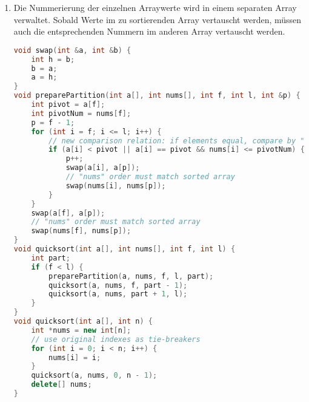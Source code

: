 \documentclass[11pt,a4paper]{article}
\begin{document}
\begin{loesung}
\begin{enumerate}
\begin{enumerate}[label=\roman*)]
            \item 
            Die Nummerierung der einzelnen Arraywerte wird in einem separaten Array verwaltet.
            Sobald Werte im zu sortierenden Array vertauscht werden, müssen auch die entsprechenden Nummern im anderen Array vertauscht werden.
            \begin{lstlisting}[language=c++]
void swap(int &a, int &b) {
    int h = b;
    b = a;
    a = h;
}
void preparePartition(int a[], int nums[], int f, int l, int &p) {
    int pivot = a[f];
    int pivotNum = nums[f];
    p = f - 1;
    for (int i = f; i <= l; i++) {
        // new comparison relation: if elements equal, compare by "num"
        if (a[i] < pivot || a[i] == pivot && nums[i] <= pivotNum) {
            p++;
            swap(a[i], a[p]);
            // "nums" order must match sorted array
            swap(nums[i], nums[p]);
        }
    }
    swap(a[f], a[p]);
    // "nums" order must match sorted array
    swap(nums[f], nums[p]);
}
void quicksort(int a[], int nums[], int f, int l) {
    int part;
    if (f < l) {
        preparePartition(a, nums, f, l, part);
        quicksort(a, nums, f, part - 1);
        quicksort(a, nums, part + 1, l);
    }
}
void quicksort(int a[], int n) {
    int *nums = new int[n];
    // use original indexes as tie-breakers
    for (int i = 0; i < n; i++) {
        nums[i] = i;
    }
    quicksort(a, nums, 0, n - 1);
    delete[] nums;
}
            \end{lstlisting}
        \end{enumerate}
    \end{enumerate}
\end{loesung}
\end{document}
